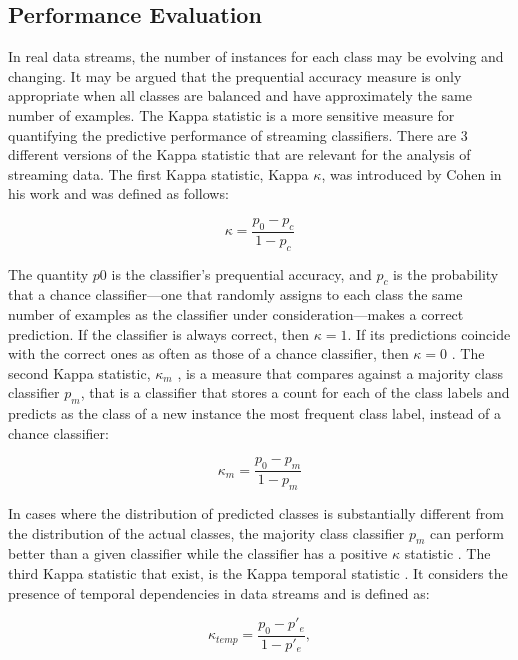 \documentclass[12pt,oneside,a4paper,parskip]{scrbook}
\begin{document}
\subsection{Performance Evaluation}
In real data streams, the number of instances for each class may be evolving and changing. It may be argued that the 
prequential accuracy measure is only appropriate when all classes are balanced and have approximately the same number 
of examples. The Kappa statistic is a more sensitive measure for quantifying the predictive performance of streaming 
classifiers. \cite{MLonDataStreams}
There are 3 different versions of the Kappa statistic that are relevant for the analysis of streaming data.
The first Kappa statistic, Kappa $\kappa$, was introduced by Cohen in his work \cite{kappak} and was defined as follows:

\begin{equation}
  \kappa = \frac{p_0-p_c}{1-p_c}
\end{equation}

The quantity $p0$ is the classifier’s prequential accuracy, and $p_c$  is the probability that a chance classifier—one
that randomly assigns to each class the same number of examples as the classifier under consideration—makes a correct 
prediction. If the classifier is always correct, then $\kappa = 1$. If its predictions coincide with the correct ones 
as often as those of a chance classifier, then $\kappa = 0$ \cite{MLonDataStreams}.
The second Kappa statistic, $\kappa_m$ \cite{kappam}, is a measure that compares against a majority class classifier $p_m$,
that is a classifier that stores a count for each of the class labels and predicts as the class of a new instance the most 
frequent class label, instead of a chance classifier:

\begin{equation}
  \kappa_m = \frac{p_0-p_m}{1-p_m}
\end{equation}

In cases where the distribution of predicted classes is substantially different from the distribution of the actual classes, 
the majority class classifier $p_m$ can perform better than a given classifier while the classifier has a positive $\kappa$ statistic \cite{MLonDataStreams}.
The third Kappa statistic that exist, is the Kappa temporal statistic \cite{kappatemp1,kappatemp2}.
It considers the presence of temporal dependencies in data streams and is defined as:

\begin{equation}
  \kappa_\textit{temp} = \frac{p_0-p'_e}{1-p'_e},
\end{equation}
\end{document}
